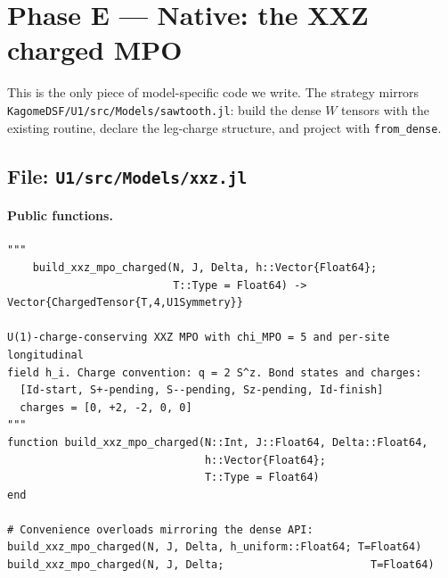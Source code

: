 \documentclass[11pt]{article}
\begin{document}
\section{Phase E --- Native: the XXZ charged MPO}
\label{sec:phase-e}

This is the only piece of model-specific code we write.  The strategy
mirrors \texttt{KagomeDSF/U1/src/Models/sawtooth.jl}: build the dense $W$
tensors with the existing routine, declare the leg-charge structure, and
project with \texttt{from\_dense}.

\subsection{File: \texttt{U1/src/Models/xxz.jl}}

\paragraph{Public functions.}
\begin{lstlisting}
"""
    build_xxz_mpo_charged(N, J, Delta, h::Vector{Float64};
                          T::Type = Float64) -> Vector{ChargedTensor{T,4,U1Symmetry}}

U(1)-charge-conserving XXZ MPO with chi_MPO = 5 and per-site longitudinal
field h_i. Charge convention: q = 2 S^z. Bond states and charges:
  [Id-start, S+-pending, S--pending, Sz-pending, Id-finish]
  charges = [0, +2, -2, 0, 0]
"""
function build_xxz_mpo_charged(N::Int, J::Float64, Delta::Float64,
                               h::Vector{Float64};
                               T::Type = Float64)
end

# Convenience overloads mirroring the dense API:
build_xxz_mpo_charged(N, J, Delta, h_uniform::Float64; T=Float64)
build_xxz_mpo_charged(N, J, Delta;                       T=Float64)
\end{lstlisting}
\end{document}
